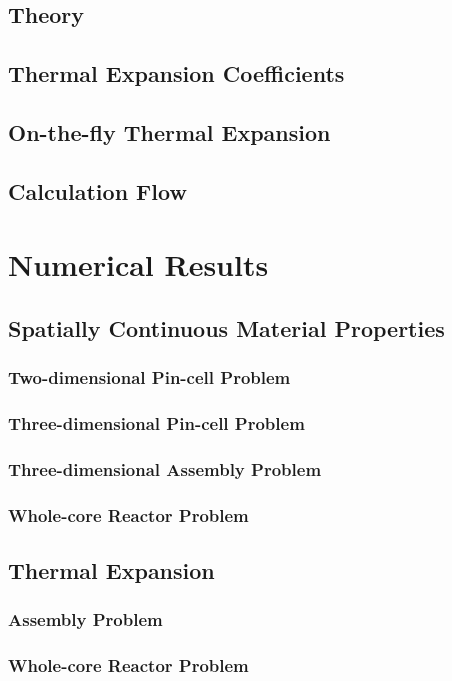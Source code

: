 \documentclass[11pt,a4paper,onecolumn,oneside]{report}
\begin{document}
\subsection{Theory}
\subsection{Thermal Expansion Coefficients}
\subsection{On-the-fly Thermal Expansion}
\subsection{Calculation Flow}


\newpage 
\section{Numerical Results} 
\subsection{Spatially Continuous Material Properties}
\subsubsection{Two-dimensional Pin-cell Problem}
\subsubsection{Three-dimensional Pin-cell Problem}
\subsubsection{Three-dimensional Assembly Problem}
\subsubsection{Whole-core Reactor Problem}

\subsection{Thermal Expansion}
\subsubsection{Assembly Problem}
\subsubsection{Whole-core Reactor Problem}
\end{document}
